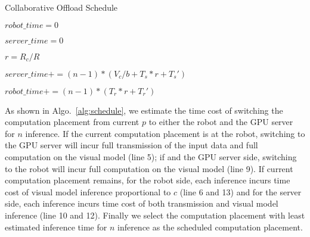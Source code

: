 \begin{algorithm}[htbp]
    \caption{\small Collaborative Offload Schedule\label{alg:schedule}}
    \DontPrintSemicolon
    
    $robot\_time = 0$
    
    $server\_time = 0$
    
    $r = R_c / R$




       $server\_time += (n-1)*(V_c / b + T_s*r + T_s')$

       $robot\_time += (n-1)*(T_r*r + T_r')$

      

\end{algorithm}

As shown in Algo.~\ref{alg:schedule}, we estimate the time cost of switching the computation placement from current $p$ to either the robot and the GPU server for $n$ inference.
If the current computation placement is at the robot, switching to the GPU server will incur full transmission of the input data and full computation on the visual model (line 5); if and the GPU server side, switching to the robot will incur full computation on the visual model (line 9).
If current computation placement remains, for the robot side, each inference incurs time cost of visual model inference proportional to $c$ (line 6 and 13) and for the server side, each inference incurs time cost of both transmission and visual model inference (line 10 and 12).
Finally we select the computation placement with least estimated inference time for $n$ inference as the scheduled computation placement.

